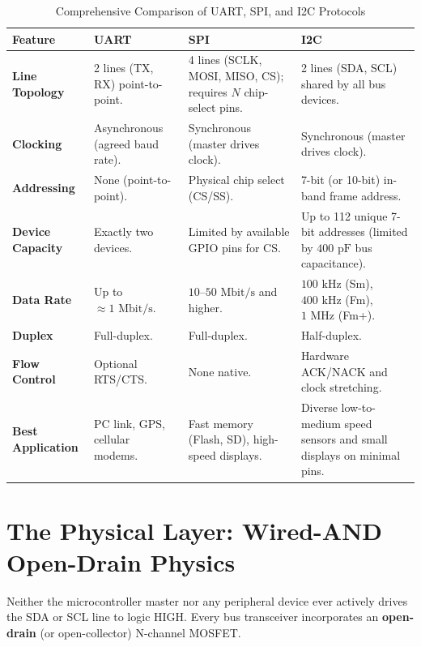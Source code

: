 \documentclass[11pt,a4paper,oneside]{report}
\begin{document}
\begin{table}[h!]
\centering
\small
\caption{Comprehensive Comparison of UART, SPI, and I2C Protocols}
\vspace{4pt}
\begin{tabularx}{\textwidth}{l p{3.2cm} p{3.8cm} X}
\toprule
\textbf{Feature} & \textbf{UART} & \textbf{SPI} & \textbf{I2C} \\
\midrule
\textbf{Line Topology} & 2 lines (TX, RX) point-to-point. & 4 lines (SCLK, MOSI, MISO, CS); requires $N$ chip-select pins. & 2 lines (SDA, SCL) shared by all bus devices. \\
\textbf{Clocking} & Asynchronous (agreed baud rate). & Synchronous (master drives clock). & Synchronous (master drives clock). \\
\textbf{Addressing} & None (point-to-point). & Physical chip select (CS/SS). & 7-bit (or 10-bit) in-band frame address. \\
\textbf{Device Capacity} & Exactly two devices. & Limited by available GPIO pins for CS. & Up to 112 unique 7-bit addresses (limited by $400\text{ pF}$ bus capacitance). \\
\textbf{Data Rate} & Up to $\approx 1\text{ Mbit/s}$. & $10\text{--}50\text{ Mbit/s}$ and higher. & $100\text{ kHz}$ (Sm), $400\text{ kHz}$ (Fm), $1\text{ MHz}$ (Fm+). \\
\textbf{Duplex} & Full-duplex. & Full-duplex. & Half-duplex. \\
\textbf{Flow Control} & Optional RTS/CTS. & None native. & Hardware ACK/NACK and clock stretching. \\
\textbf{Best Application} & PC link, GPS, cellular modems. & Fast memory (Flash, SD), high-speed displays. & Diverse low-to-medium speed sensors and small displays on minimal pins. \\
\bottomrule
\end{tabularx}
\end{table}

\section{The Physical Layer: Wired-AND Open-Drain Physics}
Neither the microcontroller master nor any peripheral device ever actively drives the SDA or SCL line to logic HIGH. Every bus transceiver incorporates an \textbf{open-drain} (or open-collector) N-channel MOSFET. 
\end{document}

